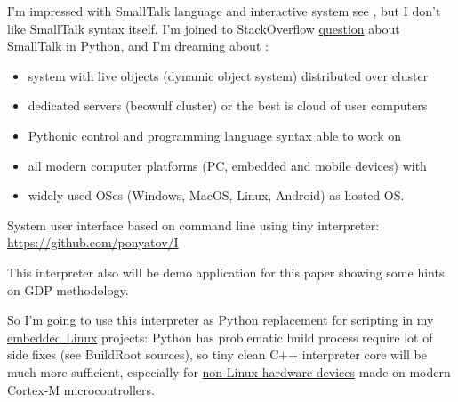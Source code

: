 \secdown

I’m impressed with SmallTalk language and interactive system see
\cite{bluebook}, but I don’t like SmallTalk syntax itself. I’m joined to
StackOverflow
\href{https://stackoverflow.com/questions/5732017/python-development-environments-like-smalltalk/42111909}{question}
about SmallTalk in Python, and I’m dreaming about :

\begin{itemize}[nosep,leftmargin=*]
  \item 
system with live objects (dynamic object system) distributed over cluster 
  \item 
dedicated servers (beowulf cluster) or the best is cloud of user computers
  \item 
Pythonic control and programming language syntax able to work on 
  \item 
all modern computer platforms (PC, embedded and mobile devices) with 
  \item 
widely
used OSes (Windows, MacOS, Linux, Android) as hosted OS.
\end{itemize}


System user interface based on command line using tiny interpreter:
\url{https://github.com/ponyatov/I}

This interpreter also will be demo application for this paper showing some hints
on GDP methodology.

So I’m going to use this interpreter as Python replacement for scripting in my
\href{https://github.com/ponyatov/L}{embedded Linux} projects: Python has
problematic build process require lot of side fixes (see BuildRoot sources), so tiny clean C++ interpreter core will be
much more sufficient, especially for
\href{https://forum.arduino.cc/index.php?topic=442285.msg3390896#msg3390896}{non-Linux
hardware devices} made on modern Cortex-M microcontrollers.


\secdown

